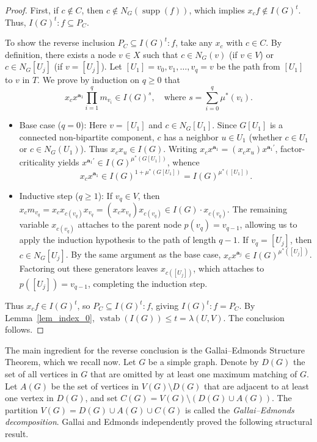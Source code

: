 \documentclass[12pt,reqno,twoside]{amsart}
\theoremstyle{definition}
\theoremstyle{plain}
\theoremstyle{remark}
\numberwithin{equation}{section}
\begin{document}
\begin{proof}
First, if $c \notin C$, then $c \notin N_G(\operatorname{supp}(f))$, which implies $x_c f \notin I(G)^t$. Thus, $I(G)^t : f \subseteq P_C$. 

To show the reverse inclusion $P_C \subseteq I(G)^t : f$, take any $x_c$ with $c \in C$. By definition, there exists a node $v \in X$ such that $c \in N_G(v)$ (if $v \in V$) or $c \in N_G[U_j]$ (if $v = [U_j]$). Let $[U_1] = v_0, v_1, \ldots, v_q = v$ be the path from $[U_1]$ to $v$ in $T$. We prove by induction on $q \ge 0$ that 
\[
x_c x^{\mathbf{a}_1} \prod_{i=1}^q m_{v_i} \in I(G)^s, \quad \text{where } s = \sum_{i=0}^q \mu^*(v_i).
\]
\begin{itemize}
    \item Base case ($q = 0$): Here $v = [U_1]$ and $c \in N_G[U_1]$. Since $G[U_1]$ is a connected non-bipartite component, $c$ has a neighbor $u \in U_1$ (whether $c \in U_1$ or $c \in N_G(U_1)$). Thus $x_c x_u \in I(G)$. Writing $x_c x^{\mathbf{a}_1} = (x_c x_u) x^{\mathbf{a}_1'}$, factor-criticality yields $x^{\mathbf{a}_1'} \in I(G)^{\mu^*(G[U_1])}$, whence
    \[
    x_c x^{\mathbf{a}_1} \in I(G)^{1 + \mu^*(G[U_1])} = I(G)^{\mu^*([U_1])}.
    \]

    \item Inductive step ($q \ge 1$): If $v_q \in V$, then $x_c m_{v_q} = x_c x_{c(v_q)} x_{v_q} = (x_c x_{v_q}) x_{c(v_q)} \in I(G) \cdot x_{c(v_q)}$. The remaining variable $x_{c(v_q)}$ attaches to the parent node $p(v_q) = v_{q-1}$, allowing us to apply the induction hypothesis to the path of length $q - 1$. If $v_q = [U_j]$, then $c \in N_G[U_j]$. By the same argument as the base case, $x_c x^{\mathbf{a}_j} \in I(G)^{\mu^*([U_j])}$. Factoring out these generators leaves $x_{c([U_j])}$, which attaches to $p([U_j]) = v_{q-1}$, completing the induction step.
\end{itemize}
Thus $x_c f \in I(G)^t$, so $P_C \subseteq I(G)^t : f$, giving $I(G)^t : f = P_C$. By Lemma~\ref{lem_index_0}, $\operatorname{vstab}(I(G)) \le t = \lambda(U,V)$. The conclusion follows.
\end{proof}

The main ingredient for the reverse conclusion is the Gallai--Edmonds Structure Theorem, which we recall now. Let $G$ be a simple graph. Denote by $D(G)$ the set of all vertices in $G$ that are omitted by at least one maximum matching of $G$. Let $A(G)$ be the set of vertices in $V(G) \setminus D(G)$ that are adjacent to at least one vertex in $D(G)$, and set $C(G) = V(G) \setminus (D(G) \cup A(G))$. The partition $V(G) = D(G) \cup A(G) \cup C(G)$ is called the \emph{Gallai--Edmonds decomposition}. Gallai \cite{G1, G2} and Edmonds \cite{E} independently proved the following structural result.
\end{document}
